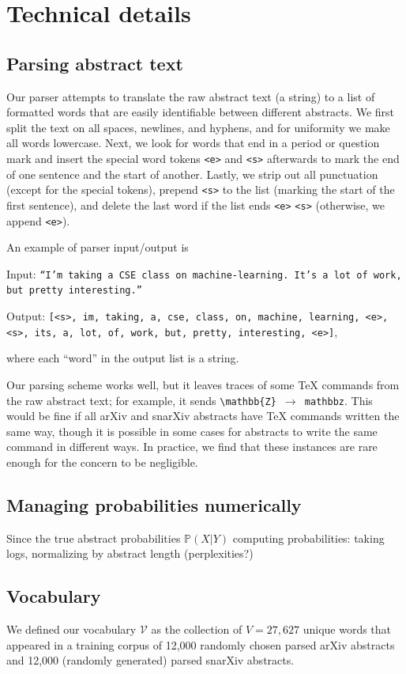 \documentclass{article}
\renewcommand{\P}{\mathbb{P}}
\newcommand{\V}{\mathcal{V}}
\begin{document}
\appendix
\section{Technical details} \label{app:details}
\subsection{Parsing abstract text}
Our parser attempts to translate the raw abstract text (a string) to a list of formatted words that are easily identifiable between different abstracts.
We first split the text on all spaces, newlines, and hyphens, and for uniformity we make all words lowercase.
Next, we look for words that end in a period or question mark and insert the special word tokens \texttt{<e>} and \texttt{<s>} afterwards to mark the end of one sentence and the start of another.
Lastly, we strip out all punctuation (except for the special tokens), prepend \texttt{<s>} to the list (marking the start of the first sentence), and delete the last word if the list ends \texttt{<e>} \texttt{<s>} (otherwise, we append \texttt{<e>}).

An example of parser input/output is

Input: \texttt{``I'm taking a CSE class on machine-learning.\ It's a lot of work, but pretty interesting.''}

Output: \texttt{[<s>, im, taking, a, cse, class, on, machine, learning, <e>, <s>, its, a, lot, of, work, but, pretty, interesting, <e>]}, 

where each ``word'' in the output list is a string.

Our parsing scheme works well, but it leaves traces of some TeX commands from the raw abstract text; for example, it sends \texttt{\textbackslash mathbb\{Z\} $\to$ mathbbz}.
This would be fine if all arXiv and snarXiv abstracts have TeX commands written the same way, though it is possible in some cases for abstracts to write the same command in different ways. In practice, we find that these instances are rare enough for the concern to be negligible.

\subsection{Managing probabilities numerically}
Since the true abstract probabilities $\P(X|Y)$
computing probabilities: taking logs, normalizing by abstract length (perplexities?)

\subsection{Vocabulary}
We defined our vocabulary $\V$ as the collection of $V=27,627$ unique words that appeared in a training corpus of 12,000 randomly chosen parsed arXiv abstracts and 12,000 (randomly generated) parsed snarXiv abstracts.
\end{document}
